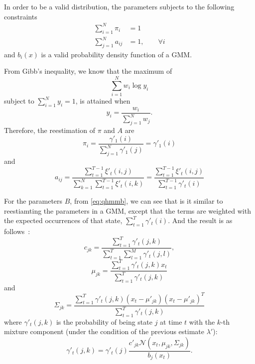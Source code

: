 \documentclass[12pt,final,twoside]{report}
\theoremstyle{plain}
\theoremstyle{definition}
\theoremstyle{remark}
\begin{document}
In order to be a valid distribution, the parameters subjects to the following constraints
\begin{align}
  \sum_{i=1}^{N} \pi_i &= 1  \\
  \sum_{j=1}^{N} a_{ij} &= 1 , \qquad \forall i 
\end{align}
and $b_i(x)$ is a valid probability density function of a GMM.

From Gibb's inequality, we know that the maximum of 
\begin{equation}
  \sum_{i=1}^N w_i \log y_i
\end{equation}
subject to $\sum_{i=1}^N y_i = 1$, is attained when
\begin{equation}
  y_i = \frac{w_i}{\sum_{j=1}^N w_j} .
\end{equation} 
Therefore, the reestimation of $\pi$ and $A$ are
\begin{equation}
  \pi_i = \frac{\gamma'_1(i)}{\sum_{j=1}^N \gamma'_1(j)} = \gamma'_1(i)
  \label{eq:hmmpi}
\end{equation} 
and
\begin{equation}
  a_{ij} = \frac{\sum_{t=1}^{T-1} \xi'_t(i,j)}{\sum_{k=1}^N \sum_{t=1}^{T-1} \xi'_t(i,k)} = \frac{\sum_{t=1}^{T-1} \xi'_t(i,j)}{\sum_{t=1}^{T-1} \gamma'_t(i)}
  \label{eq:hmma}
\end{equation} 

For the parameters $B$, from \cref{eq:qhmmb}, we can see that is it similar to reestiamting the parameters in a GMM, except that the terms are weighted with the expected occurrences of that state, $\sum_{t=1}^{T} \gamma'_t(i)$. And the result is as follows~\cite{bilmes_gentle_1998}:
\begin{equation}
  c_{jk} = \frac{\sum_{t=1}^{T} \gamma'_t(j,k)}{\sum_{t=1}^{T} \sum_{l=1}^{M} \gamma'_t(j,l)},
  \label{eq:hmmc}
\end{equation}
\begin{equation}
  \mu_{jk} = \frac{\sum_{t=1}^{T} \gamma'_t(j,k) x_t}{\sum_{t=1}^{T} \gamma'_t(j,k)}
  \label{eq:hmmmu}
\end{equation}
and
\begin{equation}
  \Sigma_{jk} = \frac{\sum_{t=1}^{T} \gamma'_t(j,k) (x_t-\mu'_{jk})(x_t-\mu'_{jk})^T}{\sum_{t=1}^{T} \gamma'_t(j,k)}
  \label{eq:hmmsigma}
\end{equation}
where $\gamma'_t(j,k)$ is the probability of being state $j$ at time $t$ with the $k$-th mixture component (under the condition of the previous estimate $\lambda'$):
\begin{equation}
  \gamma'_t(j,k) = \gamma'_t(j) \frac{c'_{jk} \mathcal{N}(x_t,\mu_{jk},\Sigma_{jk})} {b_j(x_t)} . \label{eq:hmmgamma2}
\end{equation}
\end{document}
